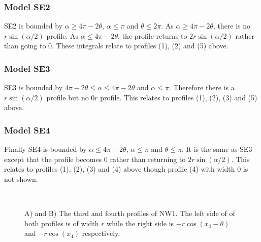 \subsubsection{Model SE2} \label{SE2}

SE2 is bounded by $\alpha \ge 4\pi - 2\theta$, $\alpha \le \pi$ and $\theta \le 2\pi$. As $\alpha \ge 4\pi - 2\theta$, there is no $r\sin(\alpha/2)$ profile. As $\alpha \le 4\pi - 2\theta$, the profile returns to $2r\sin(\alpha/2)$ rather than going to 0. These integrals relate to profiles (1), (2) and (5) above.




\subsubsection{Model SE3} \label{SE3}

SE3 is bounded by $4\pi - 2\theta \le \alpha \le 4\pi - 2\theta$ and $\alpha \le \pi$. Therefore there is a $r\sin(\alpha/2)$ profile but no $0r$ profile. This relates to profiles (1), (2), (3) and (5) above.



\subsubsection{Model SE4} \label{SE4}

Finally SE4 is bounded by  $\alpha \le 4\pi - 2\theta $, $\alpha\le\pi$ and $\theta \le \pi$. It is the same as SE3 except that the profile becomes 0 rather than returning to $2r\sin(\alpha/2)$. This relates to profiles (1), (2), (3) and (4) above though profile (4) with width 0 is not shown.




\begin{figure}[t]
        \centering
        \begin{subfigure}[t]{0.3\textwidth}
                \centering
                \caption{}
                \label{f:NW1AT}
        \end{subfigure}
~ 
        \begin{subfigure}[t]{0.3\textwidth}
                \centering
                \caption{}
                \label{f:NW1behindFull}
        \end{subfigure}
\caption{A) and B) The third and fourth profiles of NW1. The left side of of both profiles is of width $r$ while the right side is $- r\cos(x_4 - \theta)$ and $- r\cos(x_4)$ respectively. }
\label{f:NW1}
\end{figure}


